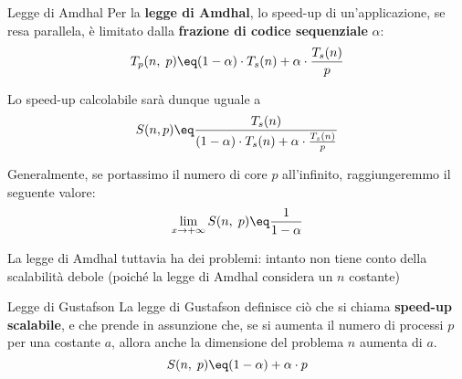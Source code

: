 \begin{definition}{Legge di Amdhal}
    Per la \textbf{legge di Amdhal}, lo speed-up di un'applicazione, se resa parallela, è limitato dalla \textbf{frazione di codice sequenziale} $\alpha$:
    \[ T_p(n, \; p) \eq (1 - \alpha) \cdot T_s(n) + \alpha \cdot \frac{T_s(n)}{p} \]

    Lo speed-up calcolabile sarà dunque uguale a
    \[ S(n, p) \eq \frac{T_s(n)}{(1 - \alpha) \cdot T_s(n) + \alpha \cdot \frac{T_s(n)}{p}} \]
\end{definition}

Generalmente, se portassimo il numero di core $p$ all'infinito, raggiungeremmo il seguente valore:
\[ \lim_{x \to +\infty} S(n, \; p) \eq \frac{1}{1 - \alpha} \]

\noindent La legge di Amdhal tuttavia ha dei problemi: intanto non tiene conto della scalabilità debole (poiché la legge di Amdhal considera un $n$ costante) %

\begin{definition}{Legge di Gustafson}
    La legge di Gustafson definisce ciò che si chiama \textbf{speed-up scalabile}, e che prende in assunzione che, se si aumenta il numero di processi $p$ per una costante $a$, allora anche la dimensione del problema $n$ aumenta di $a$.
    \[ S(n, \; p) \eq (1 - \alpha) + \alpha \cdot p \]
\end{definition}

